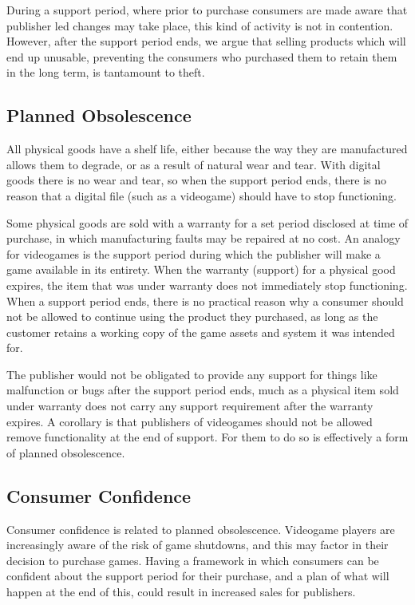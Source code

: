 During a support period, where prior to purchase consumers are made aware that publisher led changes may take place, this kind of activity is not in contention.
However, after the support period ends, we argue that selling products which will end up unusable, preventing the consumers who purchased them to retain them in the long term, is tantamount to theft.

\subsection{Planned Obsolescence}
All physical goods have a shelf life, either because the way they are manufactured allows them to degrade, or as a result of natural wear and tear.
With digital goods there is no wear and tear, so when the support period ends, there is no reason that a digital file (such as a videogame) should have to stop functioning.

Some physical goods are sold with a warranty for a set period disclosed at time of purchase, in which manufacturing faults may be repaired at no cost.
An analogy for videogames is the support period during which the publisher will make a game available in its entirety.
When the warranty (support) for a physical good expires, the item that was under warranty does not immediately stop functioning.
When a support period ends, there is no practical reason why a consumer should not be allowed to continue using the product they purchased,
as long as the customer retains a working copy of the game \glspl{asset} and system it was intended for.

The publisher would not be obligated to provide any support for things like malfunction or bugs after the support period ends,
much as a physical item sold under warranty does not carry any support requirement after the warranty expires.
A corollary is that publishers of videogames should not be allowed remove functionality at the end of support.
For them to do so is effectively a form of planned obsolescence.

\subsection{Consumer Confidence}
Consumer confidence is related to planned obsolescence.
Videogame players are increasingly aware of the risk of game shutdowns\cn,
and this may factor in their decision to purchase games\cn.
Having a framework in which consumers can be confident about the support period for their purchase, and a plan of what will happen at the end of this,
could result in increased sales for publishers.

